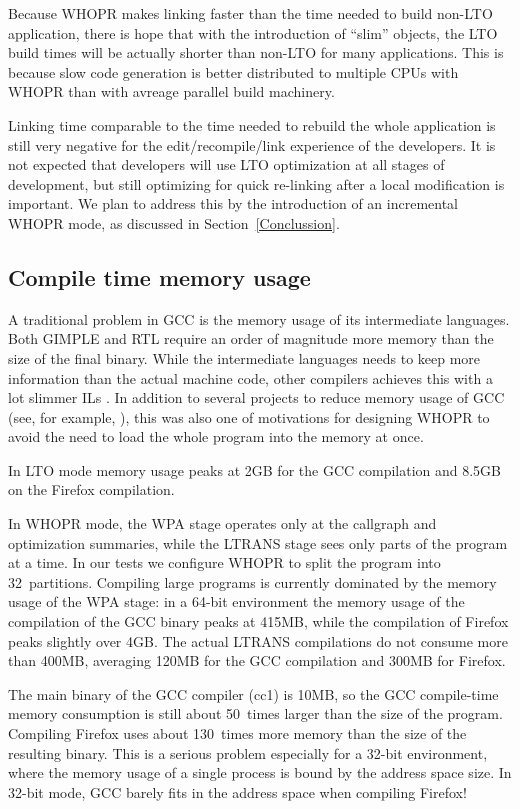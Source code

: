 \documentclass[final]{ols}
\begin{document}
Because WHOPR makes linking faster than the time needed to build non-LTO
application, there is hope that with the introduction of ``slim'' objects, the
LTO build times will be actually shorter than non-LTO for many applications.
This is because slow code generation is better distributed to multiple CPUs
with WHOPR than with avreage parallel build machinery.

Linking time comparable to the time needed to rebuild the whole
application is still very negative for the edit/recompile/link experience of
the developers. It is not expected that developers will use LTO optimization at all
stages of development, but still optimizing for quick re-linking after a
local modification is important.  We plan to address this by the introduction of an
incremental WHOPR mode, as discussed in Section~\ref{Conclussion}.
\subsection{Compile time memory usage}

A traditional problem in GCC is the memory usage of its intermediate
languages.  Both GIMPLE and RTL require an order of magnitude more memory than 
the size of the final binary. While the intermediate languages needs to keep more
information than the actual machine code, other compilers achieves this with a lot slimmer
ILs \cite{LLVM}.
In addition to several projects to reduce memory usage of GCC (see, for example,
\cite{GIMPLE}), this was also one of motivations for designing WHOPR to avoid the
 need to load the whole program into the memory at once.

In LTO mode memory usage peaks at 2GB for the GCC compilation and 8.5GB on the Firefox
compilation.

In WHOPR mode, the WPA stage operates only at the callgraph and optimization
summaries, while the LTRANS stage sees only parts of the program at a time. In
our tests we configure WHOPR to split the program into 32~partitions.  
Compiling large programs is currently dominated by the memory usage of the WPA
stage: in a 64-bit environment the memory usage of the compilation of the GCC
binary peaks at 415MB, while the compilation of Firefox peaks slightly
over 4GB.  The actual LTRANS compilations do not consume more than 400MB,
averaging 120MB for the GCC compilation and 300MB for Firefox. 

The main binary of the GCC compiler (cc1) is 10MB, so the GCC compile-time
memory consumption is still about 50~times larger than the size of the program.
Compiling Firefox uses about 130~times more memory than the size of the
resulting binary.  This is a serious problem especially for a 32-bit
environment, where the memory usage of a single process is bound by the address
space size.  In 32-bit mode, GCC barely fits in the address space when
compiling Firefox!
\end{document}
